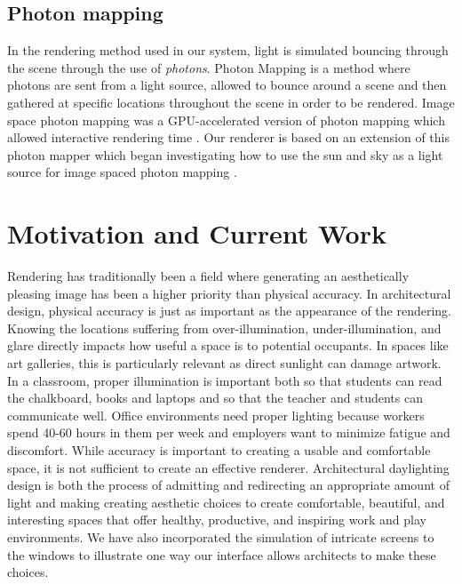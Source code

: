 \documentclass[10pt,twocolumn,letterpaper]{article}
\begin{document}
\subsection{Photon mapping}

In the rendering method used in our system, light is simulated
bouncing through the scene through the use of \emph{photons}.  Photon
Mapping is a method where photons are sent from a light source,
allowed to bounce around a scene and then gathered at specific
locations throughout the scene in order to be
rendered\cite{Jensen:1996:GIU:275458.275461}.  Image space photon
mapping was a GPU-accelerated version of photon mapping which allowed
interactive rendering time \cite{mcguire09imagespace}.  Our renderer
is based on an extension of this photon mapper which began
investigating how to use the sun and sky as a light source for image
spaced photon mapping \cite{ericli}.



\section{Motivation and Current Work}

Rendering has traditionally been a field where generating an
aesthetically pleasing image has been a higher priority than physical
accuracy.  In architectural design, physical accuracy is just as
important as the appearance of the rendering.  Knowing the locations
suffering from over-illumination, under-illumination, and glare directly
impacts how useful a space is to potential occupants.  In spaces like
art galleries, this is particularly relevant as direct sunlight can
damage artwork. 
In a classroom, proper illumination is important both so that students can 
read the chalkboard, books and laptops and so that the teacher and students 
can communicate well.
Office environments need proper lighting because workers spend 40-60 hours 
in them per week and employers want to minimize fatigue and discomfort.
While accuracy is important to creating a usable and comfortable space, 
it is not sufficient to create an
effective renderer.  Architectural daylighting design is both the
process of admitting and redirecting an appropriate amount of light
and making creating aesthetic choices to create comfortable,
beautiful, and interesting spaces that offer healthy, productive, and
inspiring work and play environments.  We have also incorporated the
simulation of intricate screens to the windows to illustrate one way
our interface allows architects to make these choices.
\end{document}
